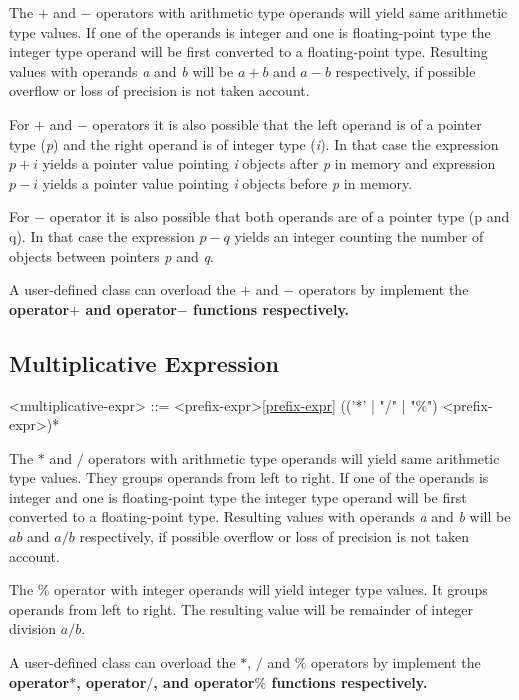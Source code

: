 \documentclass[a4paper,oneside,11pt]{article}
\begin{document}
The $+$ and $-$ operators with arithmetic type operands will yield same arithmetic type values.
If one of the operands is integer and one is floating-point type the integer type operand will be first converted to a floating-point type.
Resulting values with operands \emph{a} and \emph{b} will be $a + b$ and $a - b$ respectively,
if possible overflow or loss of precision is not taken account.

For $+$ and $-$ operators it is also possible that the left operand is of a pointer type (\emph{p}) and the right operand is of integer type (\emph{i}).
In that case the expression $p+i$ yields a pointer value pointing \emph{i} objects after \emph{p} in memory and
expression $p-i$ yields a pointer value pointing \emph{i} objects before \emph{p} in memory.

For $-$ operator it is also possible that both operands are of a pointer type (p and q).
In that case the expression $p-q$ yields an integer counting the number of objects between pointers \emph{p} and \emph{q}.

A user-defined class can overload the $+$ and $-$ operators by implement
the \bf{operator$+$} and \bf{operator$-$} functions respectively.

\subsection{Multiplicative Expression}

\begin{grammar}
\label{multiplicative-expr}<multiplicative-expr> ::= <prefix-expr>\ref{prefix-expr} (('*' | "/" | "\%") <prefix-expr>)*
\end{grammar}

The $*$ and $/$ operators with arithmetic type operands will yield same arithmetic type values. They groups operands from left to right.
If one of the operands is integer and one is floating-point type the integer type operand will be first converted to a floating-point type.
Resulting values with operands \emph{a} and \emph{b} will be $a b$ and $a / b$ respectively,
if possible overflow or loss of precision is not taken account.

The $\%$ operator with integer operands will yield integer type values. It groups operands from left to right.
The resulting value will be remainder of integer division $a / b$.

A user-defined class can overload the $*$, $/$ and $\%$ operators by implement the \bf{operator$*$}, \bf{operator$/$}, and \bf{operator$\%$}
functions respectively.
\end{document}
